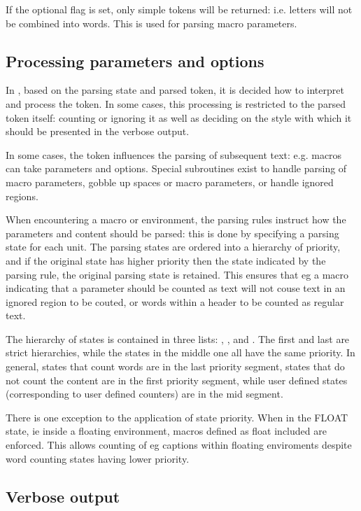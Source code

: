 \documentclass{article}
\begin{document}
If the optional  flag is set, only simple tokens will be returned: i.e. letters will not be combined into words. This is used for parsing macro parameters.


\subsection{Processing parameters and options}

In , based on the parsing state and parsed token, it is decided how to interpret and process the token. In some cases, this processing is restricted to the parsed token itself: counting or ignoring it as well as deciding on the style with which it should be presented in the verbose output.

In some cases, the token influences the parsing of subsequent text: e.g. macros can take parameters and options. Special subroutines exist to handle parsing of macro parameters, gobble up spaces or macro parameters, or handle ignored regions.

When encountering a macro or environment, the parsing rules instruct \TeXcount{} how the parameters and content should be parsed: this is done by specifying a parsing state for each unit. The parsing states are ordered into a hierarchy of priority, and if the original state has higher priority then the state indicated by the parsing rule, the original parsing state is retained. This ensures that eg a macro indicating that a parameter should be counted as text will not couse text in an ignored region to be couted, or words within a header to be counted as regular text.

The hierarchy of states is contained in three lists: , , and . The first and last are strict hierarchies, while the states in the middle one all have the same priority. In general, states that count words are in the last priority segment, states that do not count the content are in the first priority segment, while user defined states (corresponding to user defined counters) are in the mid segment.

There is one exception to the application of state priority. When in the FLOAT state, ie inside a floating environment, macros defined as float included are enforced. This allows counting of eg captions within floating enviroments despite word counting states having lower priority.


\subsection{Verbose output}
\end{document}

